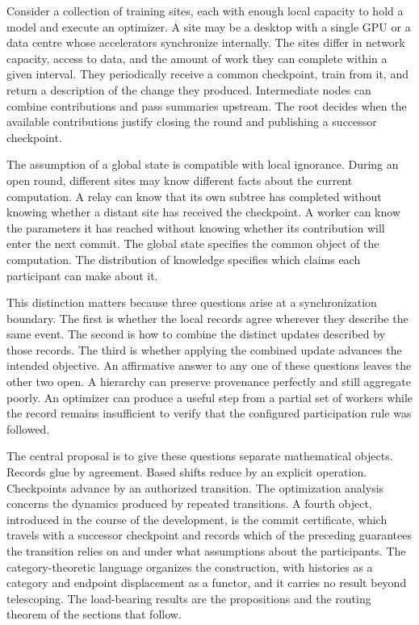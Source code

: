 \documentclass[11pt]{article}
\theoremstyle{definition}
\theoremstyle{remark}
\begin{document}
Consider a collection of training sites, each with enough local capacity to hold a model and execute an optimizer. A site may be a desktop with a single GPU or a data centre whose accelerators synchronize internally. The sites differ in network capacity, access to data, and the amount of work they can complete within a given interval. They periodically receive a common checkpoint, train from it, and return a description of the change they produced. Intermediate nodes can combine contributions and pass summaries upstream. The root decides when the available contributions justify closing the round and publishing a successor checkpoint.

The assumption of a global state is compatible with local ignorance. During an open round, different sites may know different facts about the current computation. A relay can know that its own subtree has completed without knowing whether a distant site has received the checkpoint. A worker can know the parameters it has reached without knowing whether its contribution will enter the next commit. The global state specifies the common object of the computation. The distribution of knowledge specifies which claims each participant can make about it.

This distinction matters because three questions arise at a synchronization boundary. The first is whether the local records agree wherever they describe the same event. The second is how to combine the distinct updates described by those records. The third is whether applying the combined update advances the intended objective. An affirmative answer to any one of these questions leaves the other two open. A hierarchy can preserve provenance perfectly and still aggregate poorly. An optimizer can produce a useful step from a partial set of workers while the record remains insufficient to verify that the configured participation rule was followed.

The central proposal is to give these questions separate mathematical objects. Records glue by agreement. Based shifts reduce by an explicit operation. Checkpoints advance by an authorized transition. The optimization analysis concerns the dynamics produced by repeated transitions. A fourth object, introduced in the course of the development, is the commit certificate, which travels with a successor checkpoint and records which of the preceding guarantees the transition relies on and under what assumptions about the participants. The category-theoretic language organizes the construction, with histories as a category and endpoint displacement as a functor, and it carries no result beyond telescoping. The load-bearing results are the propositions and the routing theorem of the sections that follow.
\end{document}

